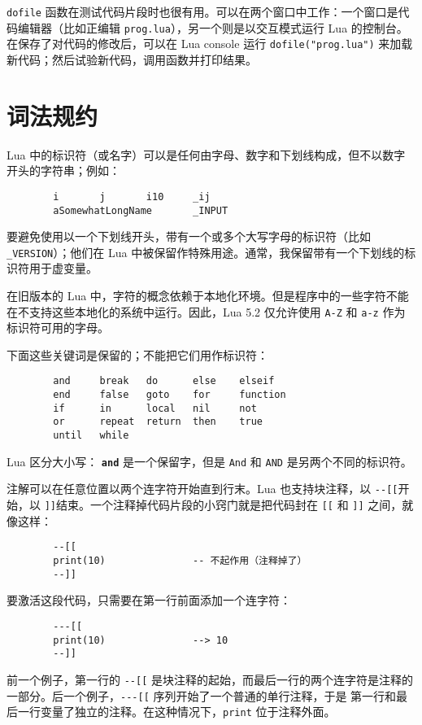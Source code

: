 \verb|dofile| 函数在测试代码片段时也很有用。可以在两个窗口中工作：一个窗口是代码编辑器（比如正编辑 \verb|prog.lua|），另一个则是以交互模式运行 Lua 的控制台。在保存了对代码的修改后，可以在 Lua console 运行 \verb|dofile("prog.lua")| 来加载新代码；然后试验新代码，调用函数并打印结果。

\section{词法规约}

Lua 中的标识符（或名字）可以是任何由字母、数字和下划线构成，但不以数字开头的字符串；例如：

\begin{verbatim}
        i       j       i10     _ij
        aSomewhatLongName       _INPUT
\end{verbatim}

要避免使用以一个下划线开头，带有一个或多个大写字母的标识符（比如 \verb|_VERSION|）；他们在 Lua 中被保留作特殊用途。通常，我保留带有一个下划线的标识符用于虚变量。

在旧版本的 Lua 中，字符的概念依赖于本地化环境。但是程序中的一些字符不能在不支持这些本地化的系统中运行。因此，Lua 5.2 仅允许使用 \verb|A-Z| 和 \verb|a-z| 作为标识符可用的字母。

下面这些关键词是保留的；不能把它们用作标识符：

\begin{verbatim}
        and     break   do      else    elseif
        end     false   goto    for     function
        if      in      local   nil     not
        or      repeat  return  then    true
        until   while
\end{verbatim}

Lua 区分大小写： {\bfseries \verb|and|} 是一个保留字，但是 \verb|And| 和 \verb|AND| 是另两个不同的标识符。

注解可以在任意位置以两个连字符开始直到行末。Lua 也支持块注释，以 \verb|--[[|开始，以 \verb|]]|结束。一个注释掉代码片段的小窍门就是把代码封在 \verb|[[| 和 \verb|]]| 之间，就像这样：

\begin{verbatim}
        --[[
        print(10)               -- 不起作用（注释掉了）
        --]]
\end{verbatim}

要激活这段代码，只需要在第一行前面添加一个连字符：

\begin{verbatim}
        ---[[
        print(10)               --> 10
        --]]
\end{verbatim}

前一个例子，第一行的 \verb|--[[| 是块注释的起始，而最后一行的两个连字符是注释的一部分。后一个例子，\verb|---[[| 序列开始了一个普通的单行注释，于是 第一行和最后一行变量了独立的注释。在这种情况下，\verb|print| 位于注释外面。